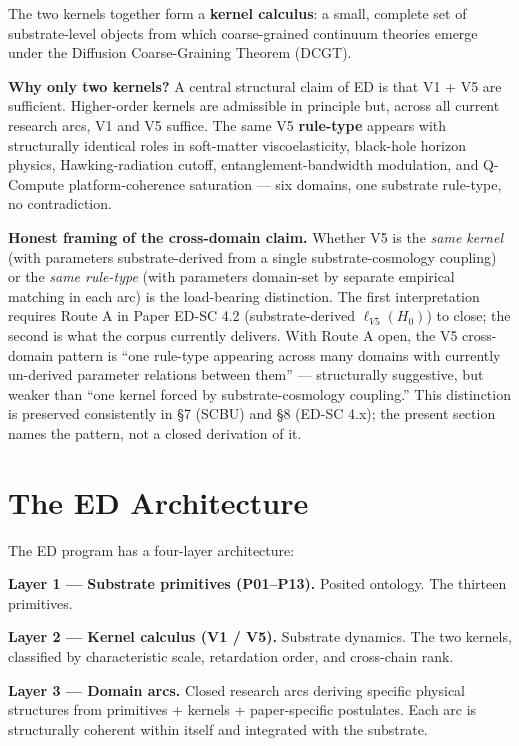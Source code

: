 \documentclass[11pt,a4paper]{article}
\begin{document}
The two kernels together form a \textbf{kernel calculus}: a small, complete set of substrate-level objects from which coarse-grained continuum theories emerge under the Diffusion Coarse-Graining Theorem (DCGT).

\textbf{Why only two kernels?} A central structural claim of ED is that V1 + V5 are sufficient. Higher-order kernels are admissible in principle but, across all current research arcs, V1 and V5 suffice. The same V5 \textbf{rule-type} appears with structurally identical roles in soft-matter viscoelasticity, black-hole horizon physics, Hawking-radiation cutoff, entanglement-bandwidth modulation, and Q-Compute platform-coherence saturation --- six domains, one substrate rule-type, no contradiction.

\textbf{Honest framing of the cross-domain claim.} Whether V5 is the \emph{same kernel} (with parameters substrate-derived from a single substrate-cosmology coupling) or the \emph{same rule-type} (with parameters domain-set by separate empirical matching in each arc) is the load-bearing distinction. The first interpretation requires Route A in Paper ED-SC 4.2 (substrate-derived $\ell_{V5}(H_0)$) to close; the second is what the corpus currently delivers. With Route A open, the V5 cross-domain pattern is ``one rule-type appearing across many domains with currently un-derived parameter relations between them'' --- structurally suggestive, but weaker than ``one kernel forced by substrate-cosmology coupling.'' This distinction is preserved consistently in \S7 (SCBU) and \S8 (ED-SC 4.x); the present section names the pattern, not a closed derivation of it.

\section{The ED Architecture}

The ED program has a four-layer architecture:

\textbf{Layer 1 --- Substrate primitives (P01--P13).} Posited ontology. The thirteen primitives.

\textbf{Layer 2 --- Kernel calculus (V1 / V5).} Substrate dynamics. The two kernels, classified by characteristic scale, retardation order, and cross-chain rank.

\textbf{Layer 3 --- Domain arcs.} Closed research arcs deriving specific physical structures from primitives + kernels + paper-specific postulates. Each arc is structurally coherent within itself and integrated with the substrate.
\end{document}
